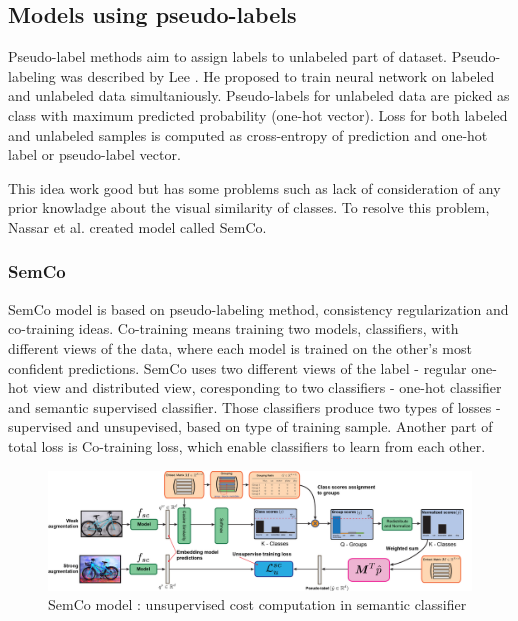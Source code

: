 \subsection{Models using pseudo-labels}
Pseudo-label methods aim to assign labels to unlabeled part of dataset. Pseudo-labeling was described by Lee \cite{lee2013}. He proposed to train neural network on labeled and unlabeled data simultaniously. Pseudo-labels for unlabeled data are picked as class with maximum predicted probability (one-hot vector). Loss for both labeled and unlabeled samples is computed as cross-entropy of prediction and one-hot label or pseudo-label vector.

This idea work good but has some problems such as lack of consideration of any prior knowladge about the visual similarity of classes. To resolve this problem, Nassar et al. \cite{nassar} created model called SemCo. 

\subsubsection{SemCo}
SemCo model is based on pseudo-labeling method, consistency regularization and co-training ideas. Co-training means training two models, classifiers, with different views of the data, where each model is trained on the other’s most confident predictions. SemCo uses two different views of the label - regular one-hot view and distributed view, coresponding to two classifiers - one-hot classifier and semantic supervised classifier. Those classifiers produce two types of losses - supervised and unsupevised, based on type of training sample. Another part of total loss is Co-training loss, which enable classifiers to learn from each other. \cite{nassar}


\begin{figure}[h!]
    \centering
    \includegraphics[width=1\linewidth]{figs/semco_unlabelled_loss_precedure.png}
    \caption{SemCo model : unsupervised cost computation in semantic classifier \cite{nassar}}
    \label{fig:semco}
\end{figure}

